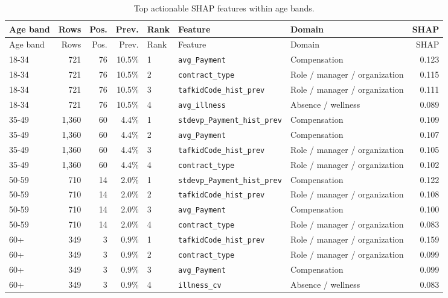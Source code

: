 \documentclass[11pt]{article}
\newcommand{\feature}[1]{\texttt{#1}}
\begin{document}
\begin{longtable}{lrrrlp{4cm}p{3cm}r}
\caption{Top actionable SHAP features within age bands.}\\
\toprule
Age band & Rows & Pos. & Prev. & Rank & Feature & Domain & SHAP \\
\midrule
\endfirsthead
\toprule
Age band & Rows & Pos. & Prev. & Rank & Feature & Domain & SHAP \\
\midrule
\endhead
18-34 & 721 & 76 & 10.5\% & 1 & \feature{avg\_Payment} & Compensation & 0.123 \\
18-34 & 721 & 76 & 10.5\% & 2 & \feature{contract\_type} & Role / manager / organization & 0.115 \\
18-34 & 721 & 76 & 10.5\% & 3 & \feature{tafkidCode\_hist\_prev} & Role / manager / organization & 0.111 \\
18-34 & 721 & 76 & 10.5\% & 4 & \feature{avg\_illness} & Absence / wellness & 0.089 \\
35-49 & 1,360 & 60 & 4.4\% & 1 & \feature{stdevp\_Payment\_hist\_prev} & Compensation & 0.109 \\
35-49 & 1,360 & 60 & 4.4\% & 2 & \feature{avg\_Payment} & Compensation & 0.107 \\
35-49 & 1,360 & 60 & 4.4\% & 3 & \feature{tafkidCode\_hist\_prev} & Role / manager / organization & 0.105 \\
35-49 & 1,360 & 60 & 4.4\% & 4 & \feature{contract\_type} & Role / manager / organization & 0.102 \\
50-59 & 710 & 14 & 2.0\% & 1 & \feature{stdevp\_Payment\_hist\_prev} & Compensation & 0.122 \\
50-59 & 710 & 14 & 2.0\% & 2 & \feature{tafkidCode\_hist\_prev} & Role / manager / organization & 0.108 \\
50-59 & 710 & 14 & 2.0\% & 3 & \feature{avg\_Payment} & Compensation & 0.100 \\
50-59 & 710 & 14 & 2.0\% & 4 & \feature{contract\_type} & Role / manager / organization & 0.083 \\
60+ & 349 & 3 & 0.9\% & 1 & \feature{tafkidCode\_hist\_prev} & Role / manager / organization & 0.159 \\
60+ & 349 & 3 & 0.9\% & 2 & \feature{contract\_type} & Role / manager / organization & 0.099 \\
60+ & 349 & 3 & 0.9\% & 3 & \feature{avg\_Payment} & Compensation & 0.099 \\
60+ & 349 & 3 & 0.9\% & 4 & \feature{illness\_cv} & Absence / wellness & 0.083 \\
\bottomrule
\end{longtable}
\end{document}
